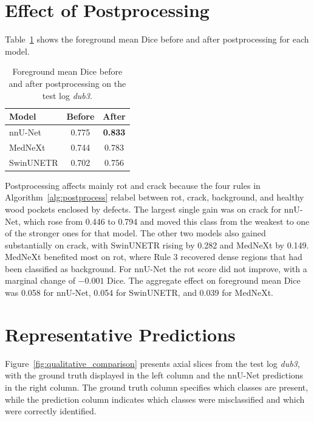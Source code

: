 \section{Effect of Postprocessing}

Table~\ref{tab:postprocessing_results} shows the foreground mean Dice before and after postprocessing for each model.
\begin{table}[H]
    \centering
    \caption{Foreground mean Dice before and after postprocessing on the test log \textit{dub3}.}
    \label{tab:postprocessing_results}
    \begin{tabular}{lcc}
        \toprule
        \textbf{Model} & \textbf{Before} & \textbf{After} \\
        \midrule
        nnU-Net   & 0.775 & \textbf{0.833} \\
        MedNeXt   & 0.744 & 0.783 \\
        SwinUNETR & 0.702 & 0.756 \\
        \bottomrule
    \end{tabular}
\end{table}
Postprocessing affects mainly rot and crack because the four rules in Algorithm~\ref{alg:postprocess} relabel between rot, crack, background, and healthy wood pockets enclosed by defects. The largest single gain was on crack for nnU-Net, which rose from 0.446 to 0.794 and moved this class from the weakest to one of the stronger ones for that model. The other two models also gained substantially on crack, with SwinUNETR rising by 0.282 and MedNeXt by 0.149. MedNeXt benefited most on rot, where Rule 3 recovered dense regions that had been classified as background. For nnU-Net the rot score did not improve, with a marginal change of $-0.001$ Dice. The aggregate effect on foreground mean Dice was 0.058 for nnU-Net, 0.054 for SwinUNETR, and 0.039 for MedNeXt.
\section{Representative Predictions}
Figure~\ref{fig:qualitative_comparison} presents axial slices from the test log \textit{dub3}, with the ground truth displayed in the left column and the nnU-Net predictions in the right column. The ground truth column specifies which classes are present, while the prediction column indicates which classes were misclassified and which were correctly identified.

